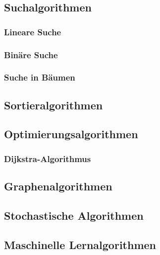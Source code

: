 \documentclass[
  letterpaper,
  DIV=11]{scrreprt}
\begin{document}
\subsection{Suchalgorithmen}\label{suchalgorithmen}

\subsubsection{Lineare Suche}\label{lineare-suche}

\subsubsection{Binäre Suche}\label{binuxe4re-suche}

\subsubsection{Suche in Bäumen}\label{suche-in-buxe4umen}

\subsection{Sortieralgorithmen}\label{sortieralgorithmen}

\subsection{Optimierungsalgorithmen}\label{optimierungsalgorithmen}

\subsubsection{Dijkstra-Algorithmus}\label{dijkstra-algorithmus}

\subsection{Graphenalgorithmen}\label{graphenalgorithmen}

\subsection{Stochastische Algorithmen}\label{stochastische-algorithmen}

\subsubsection{}\label{section}

\subsection{Maschinelle
Lernalgorithmen}\label{maschinelle-lernalgorithmen}
\end{document}
